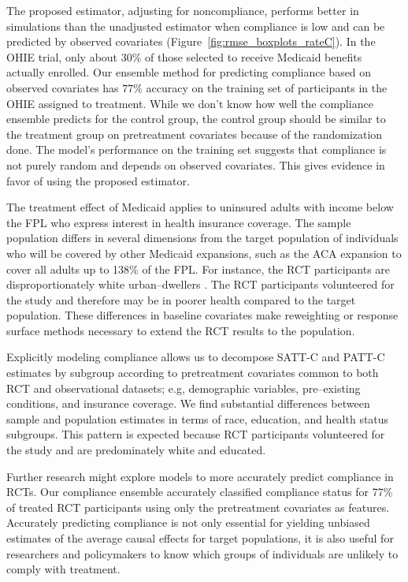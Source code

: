 \documentclass[hidelinks,12pt]{article}
\begin{document}
The proposed estimator, adjusting for noncompliance, performs better in simulations than the unadjusted estimator when compliance is low and can be predicted by observed covariates (Figure~\ref{fig:rmse_boxplots_rateC}). In the OHIE trial, only about $30\%$ of those selected to receive Medicaid benefits actually enrolled. Our ensemble method for predicting compliance based on observed covariates has $77\%$ accuracy on the training set of participants in the OHIE assigned to treatment. While we don't know how well the compliance ensemble predicts for the control group, the control group should be similar to the treatment group on pretreatment covariates because of the randomization done. The model's performance on the training set suggests that compliance is not purely random and depends on observed covariates. This gives evidence in favor of using the proposed estimator. 

The treatment effect of Medicaid applies to uninsured adults with income below the FPL who express interest in health insurance coverage. The sample population differs in several dimensions from the target population of individuals who will be covered by other Medicaid expansions, such as the ACA expansion to cover all adults up to 138\% of the FPL. For instance, the RCT participants are disproportionately white urban--dwellers \citep{Taubman}. The RCT participants volunteered for the study and therefore may be in poorer health compared to the target population. These differences in baseline covariates make {\color{red}reweighting or response surface methods} necessary to extend the RCT results to the population.

Explicitly modeling compliance allows us to decompose SATT-C and PATT-C estimates by subgroup according to pretreatment covariates common to both RCT and observational datasets{\color{red}; e.g, demographic variables, pre--existing conditions, and insurance coverage}. We find substantial differences between sample and population estimates in terms of race, education, and health status subgroups. This pattern is expected because RCT participants volunteered for the study and are predominately white and educated.

Further research might explore models to more accurately predict compliance in RCTs. Our compliance ensemble accurately classified compliance status for 77\% of treated RCT participants using only the pretreatment covariates as features. Accurately predicting compliance is not only essential for yielding unbiased estimates of the average causal effects for target populations, it is also useful for researchers and policymakers to know which groups of individuals are unlikely to comply with treatment. 
\end{document}
